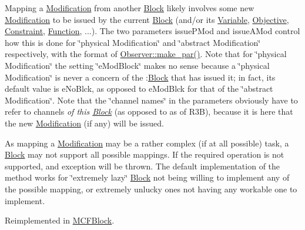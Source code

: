 Mapping a \mbox{\hyperlink{class_s_m_spp__di__unipi__it_1_1_modification}{Modification}} from another \mbox{\hyperlink{class_s_m_spp__di__unipi__it_1_1_block}{Block}} likely involves some new \mbox{\hyperlink{class_s_m_spp__di__unipi__it_1_1_modification}{Modification}} to be issued by the current \mbox{\hyperlink{class_s_m_spp__di__unipi__it_1_1_block}{Block}} (and/or its \mbox{\hyperlink{class_s_m_spp__di__unipi__it_1_1_variable}{Variable}}, \mbox{\hyperlink{class_s_m_spp__di__unipi__it_1_1_objective}{Objective}}, \mbox{\hyperlink{class_s_m_spp__di__unipi__it_1_1_constraint}{Constraint}}, \mbox{\hyperlink{class_s_m_spp__di__unipi__it_1_1_function}{Function}}, ...). The two parameters issue\+P\+Mod and issue\+A\+Mod control how this is done for \char`\"{}physical Modification\char`\"{} and \char`\"{}abstract Modification\char`\"{} respectively, with the format of \mbox{\hyperlink{class_s_m_spp__di__unipi__it_1_1_observer_a2d499ae38e5e95cf66cd71da32b0694a}{Observer\+::make\+\_\+par()}}. Note that for \char`\"{}physical Modification\char`\"{} the setting \char`\"{}e\+Mod\+Block\char`\"{} makes no sense because a \char`\"{}physical Modification\char`\"{} is never a concern of the \+:\mbox{\hyperlink{class_s_m_spp__di__unipi__it_1_1_block}{Block}} that has issued it; in fact, its default value is e\+No\+Blck, as opposed to e\+Mod\+Blck for that of the \char`\"{}abstract Modification\char`\"{}. Note that the \char`\"{}channel names\char`\"{} in the parameters obviously have to refer to channels {\itshape of this \mbox{\hyperlink{class_s_m_spp__di__unipi__it_1_1_block}{Block}}} (as opposed to as of R3B), because it is here that the new \mbox{\hyperlink{class_s_m_spp__di__unipi__it_1_1_modification}{Modification}} (if any) will be issued.

As mapping a \mbox{\hyperlink{class_s_m_spp__di__unipi__it_1_1_modification}{Modification}} may be a rather complex (if at all possible) task, a \mbox{\hyperlink{class_s_m_spp__di__unipi__it_1_1_block}{Block}} may not support all possible mappings. If the required operation is not supported, and exception will be thrown. The default implementation of the method works for \char`\"{}extremely lazy\char`\"{} \mbox{\hyperlink{class_s_m_spp__di__unipi__it_1_1_block}{Block}} not being willing to implement any of the possible mapping, or extremely unlucky ones not having any workable one to implement. 

Reimplemented in \mbox{\hyperlink{class_s_m_spp__di__unipi__it_1_1_m_c_f_block_a80212ada24a69dc8a0590eb82b5ef7c4}{M\+C\+F\+Block}}.

